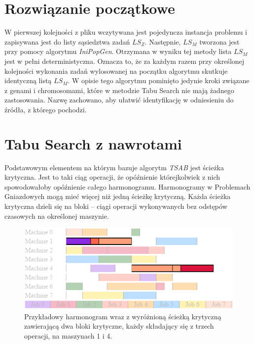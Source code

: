 \documentclass[printmode,oneside]{mgr}
\begin{document}
\section{Rozwiązanie początkowe}
W pierwszej kolejności z pliku wczytywana jest pojedyncza instancja problemu i zapisywana jest do listy sąsiedztwa zadań $LS_Z$. Następnie, $LS_M$ tworzona jest przy pomocy algorytmu \emph{IniPopGen}. Otrzymana w wyniku tej metody lista $LS_M$ jest w pełni deterministyczna. Oznacza to, że za każdym razem przy określonej kolejności wykonania zadań wylosowanej na początku algorytmu skutkuje identyczną listą $LS_M$. W opisie tego algorytmu pominięto jedynie kroki związane z genami i chromosomami, które w metodzie Tabu Search nie mają żadnego zastosowania. Nazwę zachowano, aby ułatwić identyfikację w odniesieniu do źródła, z którego pochodzi.
%
\section{Tabu Search z nawrotami}
Podstawowym elementem na którym bazuje algorytm \emph{TSAB} jest ścieżka krytyczna. Jest to taki ciąg operacji, że opóźnienie którejkolwiek z nich spowodowałoby opóźnienie całego harmonogramu. Harmonogramy w Problemach Gniazdowych mogą mieć więcej niż jedną ścieżkę krytyczną. Każda ścieżka krytyczna dzieli się na bloki \cite{Grabowski86} -- ciągi operacji wykonywanych bez odstępów czasowych na określonej maszynie.
\begin{figure}[!ht]
\begin{center}
\includegraphics[scale=1.0]{rysunki/criticalPath.png}
\caption[Przykładowy harmonogram wraz z wyróżnioną ścieżką krytyczną]{Przykładowy harmonogram wraz z wyróżnioną ścieżką krytyczną zawierającą dwa bloki krytyczne, każdy składający się z trzech operacji, na maszynach 1 i 4.}
\label{rys_critical_path_example}
\end{center}
\end{figure}
%
\end{document}
